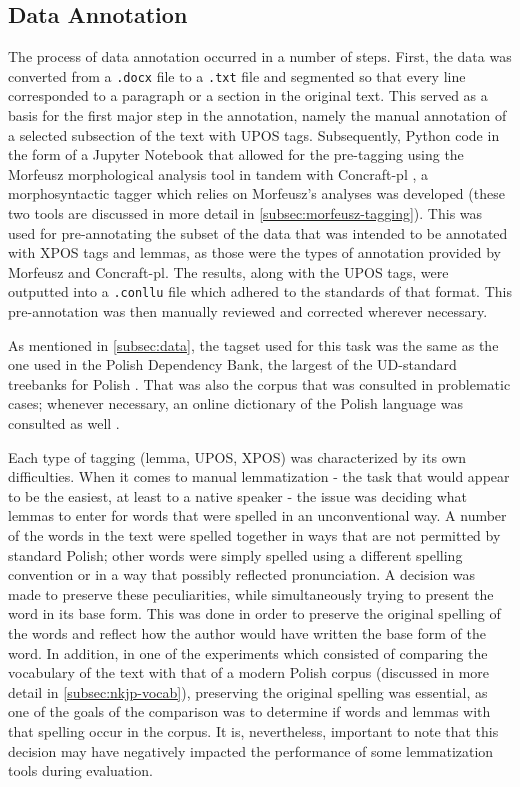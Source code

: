 \subsection{Data Annotation}
\label{subsec:annotation}

The process of data annotation occurred in a number of steps. First, the data was converted from a \texttt{.docx} file to a \texttt{.txt} file and segmented so that every line corresponded to a paragraph or a section in the original text. This served as a basis for the first major step in the annotation, namely the manual annotation of a selected subsection of the text with UPOS tags. Subsequently, Python code in the form of a Jupyter Notebook that allowed for the pre-tagging using the Morfeusz morphological analysis tool \citep{kie:wol:17:morf} in tandem with Concraft-pl \citep{waszczuk-2012-harnessing, waszczuk2018morphosyntactic}, a morphosyntactic tagger which relies on Morfeusz's analyses was developed (these two tools are discussed in more detail in \autoref{subsec:morfeusz-tagging}). This was used for pre-annotating the subset of the data that was intended to be annotated with XPOS tags and lemmas, as those were the types of annotation provided by Morfeusz and Concraft-pl. The results, along with the UPOS tags, were outputted into a \texttt{.conllu} file which adhered to the standards of that format. This pre-annotation was then manually reviewed and corrected wherever necessary.

As mentioned in \autoref{subsec:data}, the tagset used for this task was the same as the one used in the Polish Dependency Bank, the largest of the UD-standard treebanks for Polish \citep{wroblewska-2018-extended}. That was also the corpus that was consulted in problematic cases; whenever necessary, an online dictionary of the Polish language was consulted as well \citep{pwn_n.d.}.

Each type of tagging (lemma, UPOS, XPOS) was characterized by its own difficulties. When it comes to manual lemmatization - the task that would appear to be the easiest, at least to a native speaker - the issue was deciding what lemmas to enter for words that were spelled in an unconventional way. A number of the words in the text were spelled together in ways that are not permitted by standard Polish; other words were simply spelled using a different spelling convention or in a way that possibly reflected pronunciation. A decision was made to preserve these peculiarities, while simultaneously trying to present the word in its base form. This was done in order to preserve the original spelling of the words and reflect how the author would have written the base form of the word. In addition, in one of the experiments which consisted of comparing the vocabulary of the text with that of a modern Polish corpus (discussed in more detail in \autoref{subsec:nkjp-vocab}), preserving the original spelling was essential, as one of the goals of the comparison was to determine if words and lemmas with that spelling occur in the corpus. It is, nevertheless, important to note that this decision may have negatively impacted the performance of some lemmatization tools during evaluation. 

